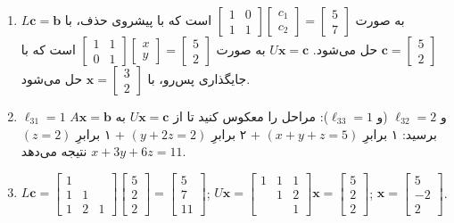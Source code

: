 \documentclass[12pt,a4paper]{article}
\begin{document}
{\begin{enumerate}
			\item $L\boldsymbol{c}=\boldsymbol{b}$ به صورت $\begin{bmatrix} 1 & 0 \\ 1 & 1 \end{bmatrix} \begin{bmatrix} c_1 \\ c_2 \end{bmatrix} = \begin{bmatrix} 5 \\ 7 \end{bmatrix}$ است که با پیشروی حذف، با $\boldsymbol{c}=\begin{bmatrix} 5 \\ 2 \end{bmatrix}$ حل می‌شود. $U\boldsymbol{x}=\boldsymbol{c}$ به صورت $\begin{bmatrix} 1 & 1 \\ 0 & 1 \end{bmatrix} \begin{bmatrix} x \\ y \end{bmatrix} = \begin{bmatrix} 5 \\ 2 \end{bmatrix}$ است که با جایگذاری پس‌رو، با $\boldsymbol{x}=\begin{bmatrix} 3 \\ 2 \end{bmatrix}$ حل می‌شود.
			
			\item $\ell_{31}=1$ و $\ell_{32}=2$ (و $\ell_{33}=1$): مراحل را معکوس کنید تا از $U\boldsymbol{x}=\boldsymbol{c}$ به $A\boldsymbol{x}=\boldsymbol{b}$ برسید:
			۱ برابرِ $(x+y+z=5)$ + ۲ برابرِ $(y+2z=2)$ + ۱ برابرِ $(z=2)$ نتیجه می‌دهد $x+3y+6z=11$.
			
			\item $L\boldsymbol{c} = \begin{bmatrix} 1 & & \\ 1 & 1 & \\ 1 & 2 & 1 \end{bmatrix} \begin{bmatrix} 5 \\ 2 \\ 2 \end{bmatrix} = \begin{bmatrix} 5 \\ 7 \\ 11 \end{bmatrix}$; $U\boldsymbol{x} = \begin{bmatrix} 1 & 1 & 1 \\ & 1 & 2 \\ & & 1 \end{bmatrix} \boldsymbol{x} = \begin{bmatrix} 5 \\ 2 \\ 2 \end{bmatrix}$; $\boldsymbol{x} = \begin{bmatrix} 5 \\ -2 \\ 2 \end{bmatrix}$.
			

\end{enumerate}}
\end{document}
